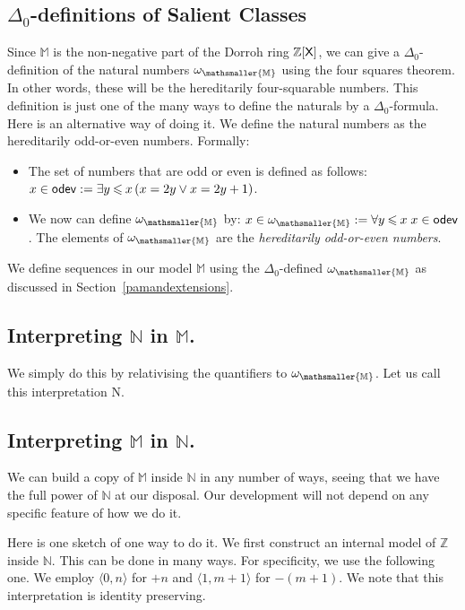 \documentclass{amsart}
\renewcommand{\leq}{\leqslant}
\newcommand{\tupel}[1]{{\langle #1 \rangle}}
\newcommand{\bleq}{\mathbin{\leq}}
\newcommand{\X}{{\sf X}}
\newcommand{\odev}{{\sf odev}}
\newcommand{\mbbs}[1]{\ensuremath{\mathsmaller{\mathbb{#1}}}}
\begin{document}
\subsection{$\Delta_0$-definitions of Salient Classes}
Since $\mathbb M$ is the non-negative part of the Dorroh ring $\mathbb Z[\X]$, we can give a $\Delta_0$-definition of the natural numbers $\omega_{\mbbs M}$
using the four squares theorem. In other words, these will be the hereditarily four-squarable numbers.
This definition is just one of the many ways to define the naturals by a $\Delta_0$-formula. Here is an alternative way of doing it.
We define the natural numbers as the hereditarily odd-or-even numbers. Formally:
\begin{itemize}
\item
The set of numbers that are odd or even is defined as follows:\\
  $x\in \odev := \exists y \bleq x\, (x =  2 y \vee x =  2 y+1) $.
 \item
 We now can define $\omega_{\mbbs{M}}$ by:
 $x\in \omega_{\mbbs{M}} := \forall y \bleq x\; x\in \odev$.
 The elements of $\omega_{\mbbs{M}}$ are the \emph{hereditarily odd-or-even numbers}.
\end{itemize}

We define sequences in our model $\mathbb M$ using the $\Delta_0$-defined $\omega_{\mbbs{M}}$
as discussed in Section~\ref{pamandextensions}.

\subsection{Interpreting $\mathbb N$ in $\mathbb M$.}
We simply do this by relativising the quantifiers to $\omega_{\mbbs M}$. Let us call this interpretation {\sf N}.

\subsection{Interpreting $\mathbb M$ in $\mathbb N$.}
We can build a copy of $\mathbb M$ inside $\mathbb N$ in any number of ways, seeing that
we have the full power of $\mathbb N$ at our disposal. Our development will not depend on any specific
feature of how we do it. 

Here is one sketch of one way to do it. We first construct an internal model of $\mathbb Z$
inside $\mathbb N$. This can be done in many ways. For specificity, we use the following one.
We employ $\tupel{0,n}$ for $+n$ and $\tupel{1,m+1}$ for $-(m+1)$. We note that this interpretation is identity preserving.
\end{document}
